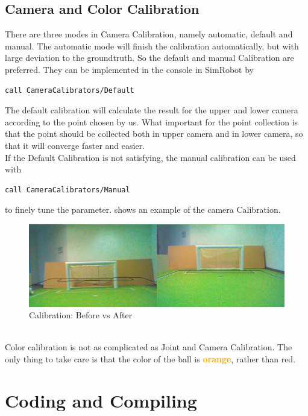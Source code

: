 \subsection{Camera and Color Calibration}
There are three modes in Camera Calibration, namely automatic, default and manual. The automatic mode will finish the calibration automatically, but with large deviation to the groundtruth. So the default and manual Calibration are preferred. They can be implemented in the console in SimRobot by
\begin{lstlisting}
call CameraCalibrators/Default
\end{lstlisting}
The default calibration will calculate the result for the upper and lower camera according to the point chosen by us. What important for the point collection is that the point should be collected both in upper camera and in lower camera, so that it will converge faster and easier. \\
If the Default Calibration is not satisfying, the manual calibration can be used with
\begin{lstlisting}
call CameraCalibrators/Manual
\end{lstlisting}
to finely tune the parameter.  shows an example of the camera Calibration.
\begin{figure}[!htb]
    \includegraphics[width=\textwidth]{pics/Camera_Calibration}
    \centering
    \caption{Calibration: Before vs After}
    \label{CaCl}
\end{figure}\\
Color calibration is not as complicated as Joint and Camera Calibration. The only thing to take care is that the color of the ball is \textcolor{orange}{\textbf{orange}}, rather than red.

\section{Coding and Compiling}
